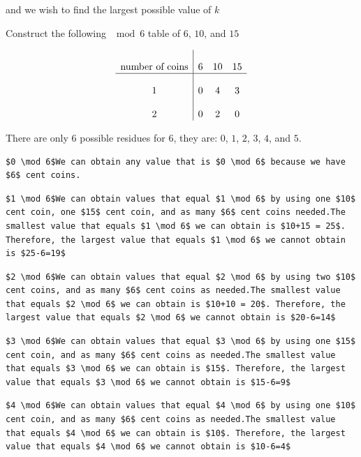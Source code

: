 \begin{enumerate}
 and we wish to find the largest possible value of $k$

 Construct the following $\mod 6$ table of $6$, $10$, and $15$

 \[\begin{array}{c|ccc}  &  &  & \\ \text{number of coins} & 6 & 10 & 15 \\  \hline  &  &  & \\  1 & 0 & 4 & 3\\  &  &  &  \\ 2 & 0 & 2 & 0 \\ \end{array}\]

 There are only $6$ possible residues for $6$, they are: $0$, $1$, $2$, $3$, $4$, and $5$.

 \begin{verbatim}
$0 \mod 6$We can obtain any value that is $0 \mod 6$ because we have $6$ cent coins.
\end{verbatim}

\begin{verbatim}
$1 \mod 6$We can obtain values that equal $1 \mod 6$ by using one $10$ cent coin, one $15$ cent coin, and as many $6$ cent coins needed.The smallest value that equals $1 \mod 6$ we can obtain is $10+15 = 25$. Therefore, the largest value that equals $1 \mod 6$ we cannot obtain is $25-6=19$
\end{verbatim}

\begin{verbatim}
$2 \mod 6$We can obtain values that equal $2 \mod 6$ by using two $10$ cent coins, and as many $6$ cent coins as needed.The smallest value that equals $2 \mod 6$ we can obtain is $10+10 = 20$. Therefore, the largest value that equals $2 \mod 6$ we cannot obtain is $20-6=14$
\end{verbatim}

\begin{verbatim}
$3 \mod 6$We can obtain values that equal $3 \mod 6$ by using one $15$ cent coin, and as many $6$ cent coins as needed.The smallest value that equals $3 \mod 6$ we can obtain is $15$. Therefore, the largest value that equals $3 \mod 6$ we cannot obtain is $15-6=9$
\end{verbatim}

\begin{verbatim}
$4 \mod 6$We can obtain values that equal $4 \mod 6$ by using one $10$ cent coin, and as many $6$ cent coins as needed.The smallest value that equals $4 \mod 6$ we can obtain is $10$. Therefore, the largest value that equals $4 \mod 6$ we cannot obtain is $10-6=4$
\end{verbatim}


\end{enumerate}
